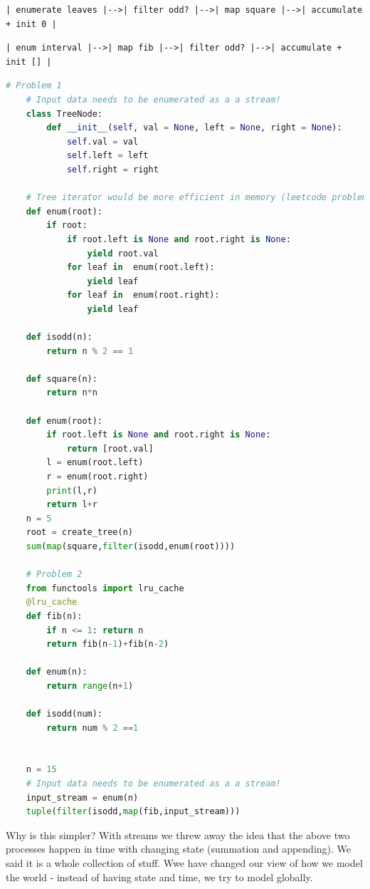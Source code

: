 \documentclass[a4paper,twoside]{article}
\numberwithin{equation}{section}
\begin{document}
\begin{lstlisting}
| enumerate leaves |-->| filter odd? |-->| map square |-->| accumulate + init 0 |
\end{lstlisting}

\begin{lstlisting}
| enum interval |-->| map fib |-->| filter odd? |-->| accumulate + init [] |
\end{lstlisting}
\begin{lstlisting}[language=Python]
    # Problem 1
    # Input data needs to be enumerated as a a stream!
    class TreeNode:
        def __init__(self, val = None, left = None, right = None):
            self.val = val
            self.left = left
            self.right = right

    # Tree iterator would be more efficient in memory (leetcode problem)
    def enum(root):
        if root:
            if root.left is None and root.right is None:
                yield root.val
            for leaf in  enum(root.left):
                yield leaf
            for leaf in  enum(root.right):
                yield leaf

    def isodd(n):
        return n % 2 == 1

    def square(n):
        return n*n

    def enum(root):
        if root.left is None and root.right is None:
            return [root.val]
        l = enum(root.left)
        r = enum(root.right)
        print(l,r)
        return l+r
    n = 5
    root = create_tree(n)
    sum(map(square,filter(isodd,enum(root))))

    # Problem 2
    from functools import lru_cache
    @lru_cache
    def fib(n):
        if n <= 1: return n
        return fib(n-1)+fib(n-2)

    def enum(n):
        return range(n+1)

    def isodd(num):
        return num % 2 ==1


    n = 15
    # Input data needs to be enumerated as a a stream!
    input_stream = enum(n)
    tuple(filter(isodd,map(fib,input_stream)))
\end{lstlisting}

Why is this simpler? With streams we threw away the idea that the above two processes happen in time
with changing state (summation and appending). We said it is a whole collection of stuff. Wwe have
changed our view of how we model the world - instead of having state and time, we try to model globally.
\end{document}
